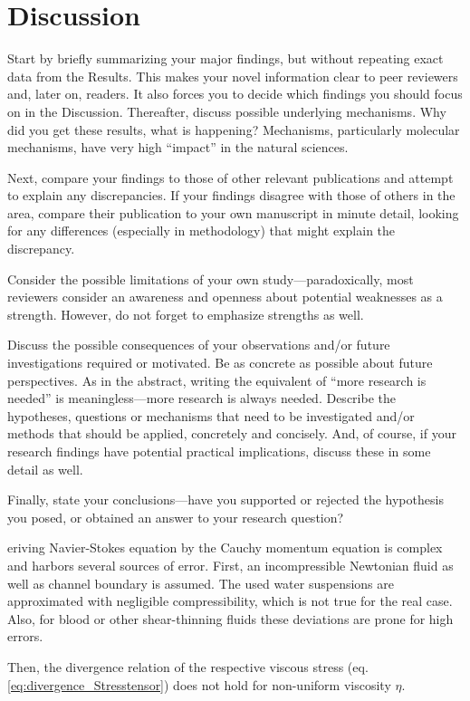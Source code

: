 \chapter{Discussion}
Start by briefly summarizing your major findings, but without repeating exact data from the Results. This makes your novel information clear to peer reviewers and, later on, readers. It also forces you to decide which findings you should focus on in the Discussion.
Thereafter, discuss possible underlying mechanisms. Why did you get these results, what is happening? Mechanisms, particularly molecular mechanisms, have very high “impact” in the natural sciences.

Next, compare your findings to those of other relevant publications and attempt to explain any discrepancies. If your findings disagree with those of others in the area, compare their publication to your own manuscript in minute detail, looking for any differences (especially in methodology) that might explain the discrepancy.

Consider the possible limitations of your own study—paradoxically, most reviewers consider an awareness and openness about potential weaknesses as a strength. However, do not forget to emphasize strengths as well.

Discuss the possible consequences of your observations and/or future investigations required or motivated. Be as concrete as possible about future perspectives. As in the abstract, writing the equivalent of “more research is needed” is meaningless—more research is always needed. Describe the hypotheses, questions or mechanisms that need to be investigated and/or methods that should be applied, concretely and concisely. And, of course, if your research findings have potential practical implications, discuss these in some detail as well.

Finally, state your conclusions—have you supported or rejected the hypothesis you posed, or obtained an answer to your research question?





eriving Navier-Stokes equation by the Cauchy momentum equation is complex and harbors several sources of error. First, an incompressible Newtonian fluid as well as channel boundary is assumed. The used water suspensions are approximated with negligible compressibility, which is not true for the real case. Also, for blood or other shear-thinning fluids these deviations are prone for high errors.  

Then, the divergence relation of the respective viscous stress (eq. \ref{eq:divergence_Stresstensor}) does not hold for non-uniform viscosity $\eta$.

